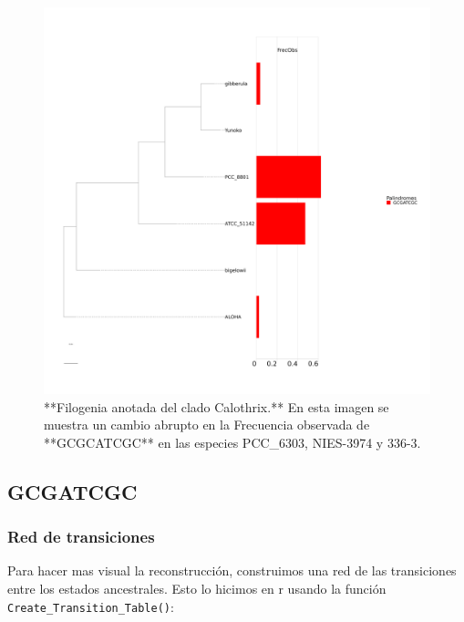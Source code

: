 \documentclass[
]{book}
\begin{document}
\begin{figure}

{\centering \includegraphics[width=1\linewidth]{Clados/Cyanobacterium_clade/figures/cyanobacterium_Octanuc_FrecObs_sel32_filogenia_HIG} 

}

\caption{**Filogenia anotada del clado Calothrix.** En esta imagen se muestra un cambio abrupto en la Frecuencia observada de **GCGCATCGC** en las especies PCC\_6303, NIES-3974 y 336-3.}\label{fig:FIG12C}
\end{figure}

\hypertarget{gcgatcgc-1}{%
\subsection{GCGATCGC}\label{gcgatcgc-1}}

\hypertarget{red-de-transiciones-2}{%
\subsubsection{Red de transiciones}\label{red-de-transiciones-2}}

Para hacer mas visual la reconstrucción, construimos una red de las transiciones entre los estados ancestrales. Esto lo hicimos en r usando la función \texttt{Create\_Transition\_Table()}:
\end{document}
